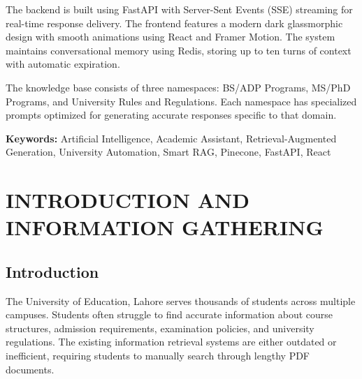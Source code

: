\documentclass[12pt,a4paper]{book}
\numberwithin{table}{chapter}
\numberwithin{figure}{chapter}
\numberwithin{equation}{chapter}
\begin{document}
\bigskip
The backend is built using FastAPI with Server-Sent Events (SSE) streaming for real-time response delivery. The frontend features a modern dark glassmorphic design with smooth animations using React and Framer Motion. The system maintains conversational memory using Redis, storing up to ten turns of context with automatic expiration.

\bigskip
The knowledge base consists of three namespaces: BS/ADP Programs, MS/PhD Programs, and University Rules and Regulations. Each namespace has specialized prompts optimized for generating accurate responses specific to that domain.

\bigskip
\textbf{Keywords:} Artificial Intelligence, Academic Assistant, Retrieval-Augmented Generation, University Automation, Smart RAG, Pinecone, FastAPI, React

\clearpage

\tableofcontents
\clearpage

\listoftables
\clearpage

\listoffigures
\clearpage

\cleardoublepage
{}
\chapter{INTRODUCTION AND INFORMATION GATHERING}

\section{Introduction}

The University of Education, Lahore serves thousands of students across multiple campuses. Students often struggle to find accurate information about course structures, admission requirements, examination policies, and university regulations. The existing information retrieval systems are either outdated or inefficient, requiring students to manually search through lengthy PDF documents.
\end{document}

